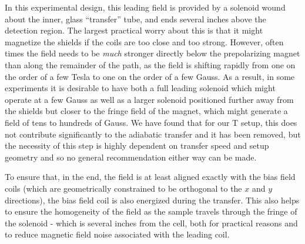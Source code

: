 \documentclass[PaulGanssle-Thesis.tex]{subfiles}
\begin{document}
In this experimental design, this leading field is provided by a solenoid wound about the inner, glass ``transfer'' tube, and ends several inches above the detection region. The largest practical worry about this is that it might magnetize the shields if the coils are too close and too strong. However, often times the field needs to be \textit{much} stronger directly below the prepolarizing magnet than along the remainder of the path, as the field is shifting rapidly from one on the order of a few Tesla to one on the order of a few Gauss. As a result, in some experiments it is desirable to have both a full leading solenoid which might operate at a few Gauss as well as a larger solenoid positioned further away from the shields but closer to the fringe field of the magnet, which might generate a field of tens to hundreds of Gauss. We have found that for our \unit[2]{T} setup, this does not contribute significantly to the adiabatic transfer and it has been removed, but the necessity of this step is highly dependent on transfer speed and setup geometry and so no general recommendation either way can be made.

To ensure that, in the end, the field is at least aligned exactly with the bias field coils (which are geometrically constrained to be orthogonal to the $x$ and $y$ directions), the bias field coil is also energized during the transfer. This also helps to ensure the homogeneity of the field as the sample travels through the fringe of the solenoid - which is several inches from the cell, both for practical reasons and to reduce magnetic field noise associated with the leading coil.
\end{document}
